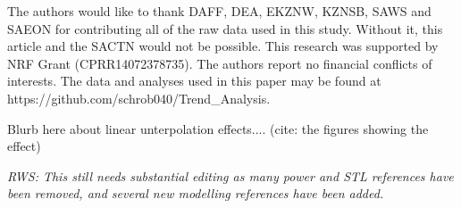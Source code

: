 \documentclass{ametsoc}
\begin{document}
\acknowledgments
The authors would like to thank DAFF, DEA, EKZNW, KZNSB, SAWS and SAEON for contributing all of the raw data used in this study. Without it, this article and the SACTN would not be possible. This research was supported by NRF Grant (CPRR14072378735). The authors report no financial conflicts of interests. The data and analyses used in this paper may be found at https://github.com/schrob040/Trend_Analysis.

%

\appendix[A]
Blurb here about linear unterpolation effects....
(cite: the figures showing the effect)

%
\emph{RWS: This still needs substantial editing as many power and STL references have been removed, and several new modelling references have been added.}
\end{document}
